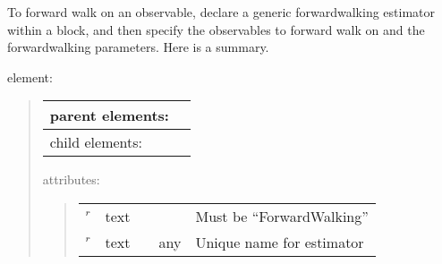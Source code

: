 \documentclass[letterpaper,10pt,english]{sphinxmanual}
\begin{document}
To forward walk on an observable, declare a generic forward\sphinxhyphen{}walking
estimator within a  block, and then specify the
observables to forward walk on and the forward\sphinxhyphen{}walking parameters. Here
is a summary.

 element:
\begin{quote}


\begin{savenotes}\sphinxattablestart
\centering
\begin{tabulary}{\linewidth}[t]{|T|T|}
\hline

parent elements:
&
\\
\hline
child elements:
&
\\
\hline
\end{tabulary}
\par
\sphinxattableend\end{savenotes}

attributes:
\begin{quote}


\begin{savenotes}\sphinxattablestart
\centering
\begin{tabulary}{\linewidth}[t]{|T|T|T|T|T|}
\hline
\sphinxstyletheadfamily 
{}
&\sphinxstyletheadfamily 
{}
&\sphinxstyletheadfamily 
{}
&\sphinxstyletheadfamily 
{}
&\sphinxstyletheadfamily 
{}
\\
\hline
{}\(^r\)
&
text
&
&&
Must be “ForwardWalking”
\\
\hline
{}\(^r\)
&
text
&
&
any
&
Unique name for estimator
\\
\hline
\end{tabulary}
\par
\sphinxattableend\end{savenotes}
\end{quote}
\end{quote}
\end{document}
